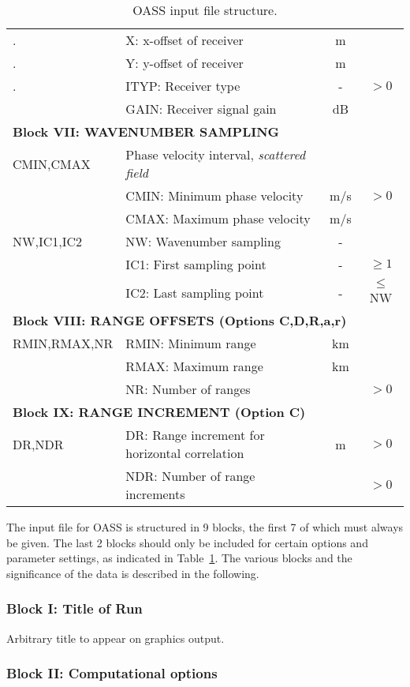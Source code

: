 \begin{table}
\begin{center}
\begin{tabular}{|l|l|c|c|}
.	& X: x-offset of receiver & m & \\ 
.	& Y: y-offset of receiver & m & \\
.	& ITYP: Receiver type  & - & $>0$ \\
	& GAIN: Receiver signal gain & dB & \\ 
\hline
\multicolumn{4}{|l|}{\bf Block VII: WAVENUMBER SAMPLING}  \\ 
\hline
CMIN,CMAX & Phase velocity interval, {\em scattered field} & & \\ 
	& CMIN: Minimum phase velocity & m/s & $>0$ \\
	& CMAX: Maximum phase velocity & m/s &  \\
NW,IC1,IC2 & NW: Wavenumber sampling & - &   \\
	& IC1: First sampling point & - & $\geq 1$ \\
	& IC2: Last sampling point & - & $\leq$NW \\
\hline
\multicolumn{4}{|l|}{\bf Block VIII: RANGE OFFSETS (Options C,D,R,a,r)}  \\
\hline
RMIN,RMAX,NR &  RMIN: Minimum range & km & \\
	& RMAX: Maximum range & km & \\
	& NR: Number of ranges & & $>0$ \\
\hline
\multicolumn{4}{|l|}{\bf Block IX: RANGE INCREMENT (Option C)}  \\
\hline
DR,NDR &  DR: Range increment for horizontal correlation & m & $>0$  \\
	& NDR: Number of range increments & & $>0$ \\
\hline
\end{tabular}
\end{center}
\caption{OASS input file structure.
 \label{tab:oassI} }
\end{table} 


The input file for OASS is structured in 9 blocks, the first 7 of
which must always
be given.
The last 2 blocks
should only be included for certain options and parameter settings, as
indicated in Table~\ref{tab:oassI}. The various blocks and the
significance of the data is described in the following.

\subsubsection{Block I: Title of Run}

Arbitrary title to appear on graphics output.

\subsubsection{Block II: Computational options}

